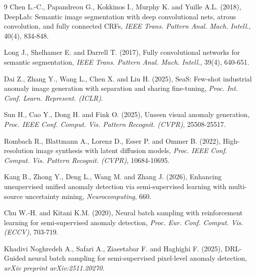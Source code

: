 \documentclass[twoside]{article}
\begin{document}
\begin{thebibliography}{9}
	Chen L.-C., Papandreou G., Kokkinos I., Murphy K. and Yuille A.L. (2018), DeepLab: Semantic image segmentation with deep convolutional nets, atrous convolution, and fully connected CRFs, {\it IEEE Trans. Pattern Anal. Mach. Intell.}, 40(4), 834-848.
	
	Long J., Shelhamer E. and Darrell T. (2017), Fully convolutional networks for semantic segmentation, {\it IEEE Trans. Pattern Anal. Mach. Intell.}, 39(4), 640-651.
	
	Dai Z., Zhang Y., Wang L., Chen X. and Liu H. (2025), SeaS: Few-shot industrial anomaly image generation with separation and sharing fine-tuning, {\it Proc. Int. Conf. Learn. Represent. (ICLR)}.
	
	Sun H., Cao Y., Dong H. and Fink O. (2025), Unseen visual anomaly generation, {\it Proc. IEEE Conf. Comput. Vis. Pattern Recognit. (CVPR)}, 25508-25517.
	
	Rombach R., Blattmann A., Lorenz D., Esser P. and Ommer B. (2022), High-resolution image synthesis with latent diffusion models, {\it Proc. IEEE Conf. Comput. Vis. Pattern Recognit. (CVPR)}, 10684-10695.
	
	Kang B., Zhong Y., Deng L., Wang M. and Zhang J. (2026), Enhancing unsupervised unified anomaly detection via semi-supervised learning with multi-source uncertainty mining, {\it Neurocomputing}, 660.
	
	Chu W.-H. and Kitani K.M. (2020), Neural batch sampling with reinforcement learning for semi-supervised anomaly detection, {\it Proc. Eur. Conf. Comput. Vis. (ECCV)}, 703-719.
	
	Khadivi Noghredeh A., Safari A., Ziaeetabar F. and Haghighi F. (2025), DRL-Guided neural batch sampling for semi-supervised pixel-level anomaly detection, {\it arXiv preprint arXiv:2511.20270}.
	
\end{thebibliography}
 
\end{document}

